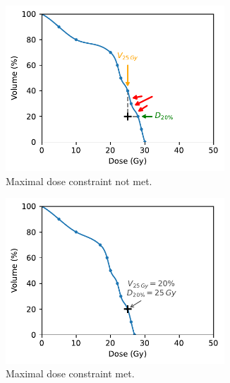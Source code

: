 \begin{figure}
	\centering
	\begin{subfigure}{0.32\textwidth}
		\centering
		\includegraphics[width=0.9\textwidth]{constraint_plot.pdf}
		\caption{Maximal dose constraint not met.}
		\label{fig:constraint_plot_unmet}
	\end{subfigure}
	\begin{subfigure}{0.32\textwidth}
		\centering
		\includegraphics[width=0.9\textwidth]{constraint_plot_met.pdf}
		\caption{Maximal dose constraint met.}
		\label{fig:constraint_plot_met}
	\end{subfigure}
	\begin{subfigure}{0.32\textwidth}
		\centering

\end{subfigure}
\end{figure}
